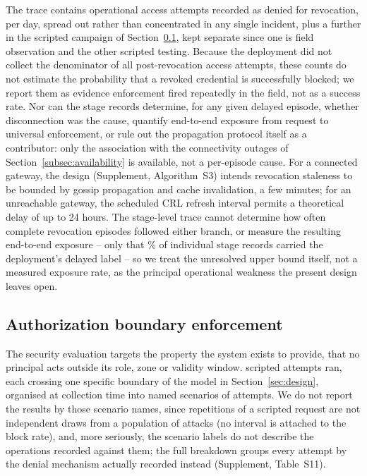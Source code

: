 \documentclass[a4paper,fleqn]{cas-sc}
\begin{document}
The trace contains \RevDenialsOperational{} operational access attempts
recorded as denied for revocation, \RevDenialsPerDay{} per day, spread out
rather than concentrated in any single incident, plus a further
\RevDenialsCampaign{} in the scripted campaign of
Section~\ref{subsec:security}, kept separate since one is field
observation and the other scripted testing. Because the deployment did
not collect the denominator of all post-revocation access attempts, these
counts do not estimate the probability that a revoked credential is
successfully blocked; we report them as evidence enforcement fired
repeatedly in the field, not as a success rate. Nor can the stage records
determine, for any given delayed episode, whether disconnection was the
cause, quantify end-to-end exposure from request to universal enforcement,
or rule out the propagation protocol itself as a contributor: only the
association with the connectivity outages of
Section~\ref{subsec:availability} is available, not a per-episode cause.
For a connected gateway, the design (Supplement, Algorithm~S3) intends
revocation staleness to be bounded by gossip propagation and cache
invalidation, a few minutes; for an unreachable gateway, the scheduled
CRL refresh interval permits a theoretical delay of up to 24 hours. The
stage-level trace cannot determine how often complete revocation
episodes followed either branch, or measure the resulting end-to-end
exposure -- only that \RevDelayedPct\% of individual stage records
carried the deployment's delayed label -- so we treat the unresolved
upper bound itself, not a measured exposure rate, as the principal
operational weakness the present design leaves open.

\subsection{Authorization boundary enforcement}
\label{subsec:security}

The security evaluation targets the property the system exists to provide,
that no principal acts outside its role, zone or validity window.
\SecAttempts{} scripted attempts ran, each crossing one specific boundary of
the model in Section~\ref{sec:design}, organised at collection time into
\SecScenarios{} named scenarios of \SecPerScenario{} attempts. We do not
report the results by those scenario names, since repetitions of a
scripted request are not independent draws from a population of attacks
(no interval is attached to the block rate), and, more seriously, the
scenario labels do not describe the operations recorded against them; the
full breakdown groups every attempt by the denial mechanism actually
recorded instead (Supplement, Table~S11).
\end{document}
